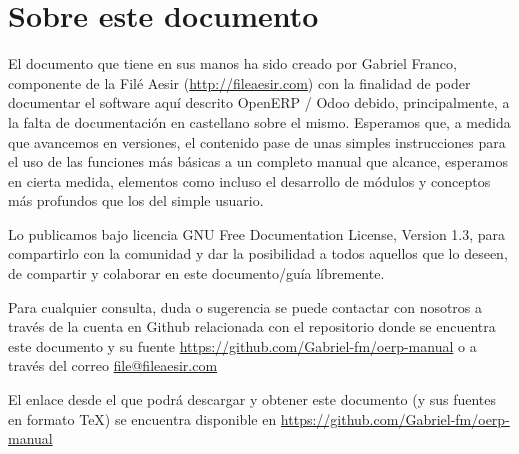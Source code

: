 \chapter*{Sobre este documento}

El documento que tiene en sus manos ha sido creado por Gabriel Franco, componente de la Filé Aesir (\url{http://fileaesir.com}) con la 
finalidad de poder documentar el software aquí descrito OpenERP / Odoo debido, principalmente, a la falta de documentación en castellano
sobre el mismo. Esperamos que, a medida que avancemos en versiones, el contenido pase de unas simples instrucciones para el uso de
las funciones más básicas a un completo manual que alcance, esperamos en cierta medida, elementos como incluso el desarrollo de módulos
y conceptos más profundos que los del simple usuario.

Lo publicamos bajo licencia GNU Free Documentation License, Version 1.3, para compartirlo con la comunidad y dar la posibilidad a todos
aquellos que lo deseen, de compartir y colaborar en este documento/guía líbremente.

Para cualquier consulta, duda o sugerencia se puede contactar con nosotros a través de la cuenta en Github relacionada con el repositorio
donde se encuentra este documento y su fuente \url{https://github.com/Gabriel-fm/oerp-manual} o a través del correo \href{mailto:file@fileaesir.com}{file@fileaesir.com}

El enlace desde el que podrá descargar y obtener este documento (y sus fuentes en formato TeX) se encuentra disponible en \url{https://github.com/Gabriel-fm/oerp-manual}
